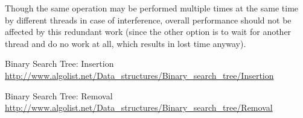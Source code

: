 \documentclass[a4paper]{article}
\begin{document}
Though the same operation may be performed multiple times at the same time by different threads in case of interference, overall performance should not be affected by this redundant work (since the other option is to wait for another thread and do no work at all, which results in lost time anyway).

\begin{thebibliography}{}

    Binary Search Tree: Insertion
    \url{http://www.algolist.net/Data_structures/Binary_search_tree/Insertion}
    
    Binary Search Tree: Removal
    \url{http://www.algolist.net/Data_structures/Binary_search_tree/Removal}
  
\end{thebibliography}
\end{document}
